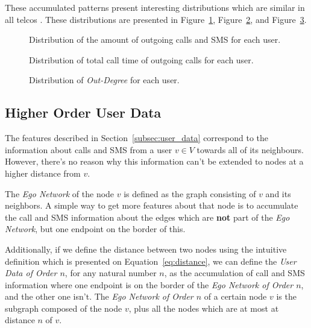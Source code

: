 These accumulated patterns present interesting distributions which are similar in all telcos . These distributions are presented in Figure~\ref{fig:callsms}, Figure~\ref{fig:time}, and Figure~\ref{fig:contacts}.

\begin{figure}
\caption{Distribution of the amount of outgoing calls and SMS for each user.}
\label{fig:callsms}
\end{figure}

\begin{figure}
\caption{Distribution of total call time of outgoing calls for each user.}
\label{fig:time}
\end{figure}

\begin{figure}
\caption{Distribution of \emph{Out-Degree} for each user.}
\label{fig:contacts}
\end{figure}

\subsection{Higher Order User Data}
\label{subsec:higherorderuserdata}

The features described in Section~\ref{subsec:user_data} correspond to the information about calls and SMS from a user $v \in V$ towards all of its neighbours. However, there's no reason why this information can't be extended to nodes at a higher distance from $v$.

The \emph{Ego Network} of the node $v$ is defined as the graph consisting of $v$ and its neighbors. A simple way to get more features about that node is to accumulate the call and SMS information about the edges which are \textbf{not} part of the \emph{Ego Network}, but one endpoint on the border of this.

Additionally, if we define the distance between two nodes using the intuitive definition which is presented on Equation~\ref{eq:distance}, we can define the \emph{User Data of Order $n$}, for any natural number $n$, as the accumulation of call and SMS information where one endpoint is on the border of the \emph{Ego Network of Order $n$}, and the other one isn't. The \emph{Ego Network of Order $n$} of a certain node $v$ is the subgraph composed of the node $v$, plus all the nodes which are at most at distance $n$ of $v$.

